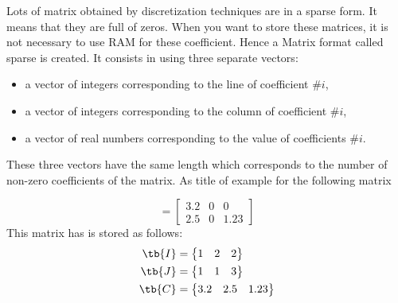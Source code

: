 \bexo

Lots of matrix obtained by discretization techniques are in a sparse form. It means that they are full of zeros. When you want to store these matrices, it is not necessary to use RAM for these coefficient. Hence a Matrix format called sparse is created. It consists in using three separate vectors:
\begin{itemize}
	\item a vector  of integers corresponding to the line of coefficient \#$i$,
	\item a vector  of integers corresponding to the column of coefficient \#$i$, 
	\item a vector  of real numbers corresponding to the value of coefficients \#$i$.
\end{itemize}
These three vectors have the same length which corresponds to the number of non-zero coefficients of the matrix.  As title of example for the following matrix 

\begin{equation}
	[\tb{M}]=\begin{bmatrix}
		3.2 & 0 &0\\
		2.5&0 &1.23
	\end{bmatrix}
\end{equation}
This matrix has 
is stored as follows:
\begin{align}
	\tb{I}&=\begin{Bmatrix}
		1 & 2 & 2
	\end{Bmatrix}\\
	\tb{J}&=\begin{Bmatrix}
		1 & 1 & 3
	\end{Bmatrix}\\
	\tb{C}&=\begin{Bmatrix}
		3.2 & 2.5 & 1.23
	\end{Bmatrix}\\
\end{align} 


